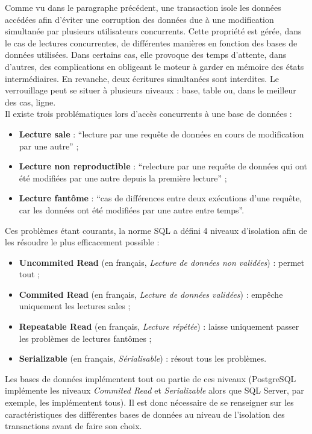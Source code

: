 	Comme vu dans le paragraphe précédent, une transaction isole les données accédées afin d'éviter une corruption des données due à une modification simultanée par plusieurs utilisateurs concurrents. Cette propriété est gérée, dans le cas de lectures concurrentes, de différentes manières en fonction des bases de données utilisées. Dans certains cas, elle provoque des temps d'attente, dans d'autres, des complications en obligeant le moteur à garder en mémoire des états intermédiaires. En revanche, deux écritures simultanées sont interdites. Le verrouillage peut se situer à plusieurs niveaux : base, table ou, dans le meilleur des cas, ligne.\\

	Il existe trois problématiques lors d'accès concurrents à une base de données :
	\vspace{10px}
	\begin{itemize}
		\item \textbf{Lecture sale} : \enquote{lecture par une requête de données en cours de modification par une autre}\cite{wiktionnaireLectureSale} ;
		\item \textbf{Lecture non reproductible} : \enquote{relecture par une requête de données qui ont été modifiées par une autre depuis la première lecture}\cite{wiktionnaireLectureNonReproductible} ;
		\item \textbf{Lecture fantôme} : \enquote{cas de différences entre deux exécutions d'une requête, car les données ont été modifiées par une autre entre temps}\cite{wiktionnaireLectureFantome}.
	\end{itemize}
	\vspace{10px}

	 Ces problèmes étant courants, la norme SQL a défini 4 niveaux d'isolation afin de les résoudre le plus efficacement possible :
	\vspace{10px}
	\begin{itemize}
		\item \textbf{Uncommited Read} (en français, \textit{Lecture de données non validées}) : permet tout ;
		\item \textbf{Commited Read} (en français, \textit{Lecture de données validées}) : empêche uniquement les lectures sales ;
		\item \textbf{Repeatable Read} (en français, \textit{Lecture répétée}) : laisse uniquement passer les problèmes de lectures fantômes ;
		\item \textbf{Serializable} (en français, \textit{Sérialisable}) : résout tous les problèmes.
	\end{itemize}
	\vspace{20px}
	 Les bases de données implémentent tout ou partie de ces niveaux (PostgreSQL implémente les niveaux \textit{Commited Read} et \textit{Serializable}\cite{isolationTransactionPostgre} alors que SQL Server, par exemple, les implémentent tous\cite{isolationTransactionSQLServer}). Il est donc nécessaire de se renseigner sur les caractéristiques des différentes bases de données au niveau de l'isolation des transactions avant de faire son choix.\\

